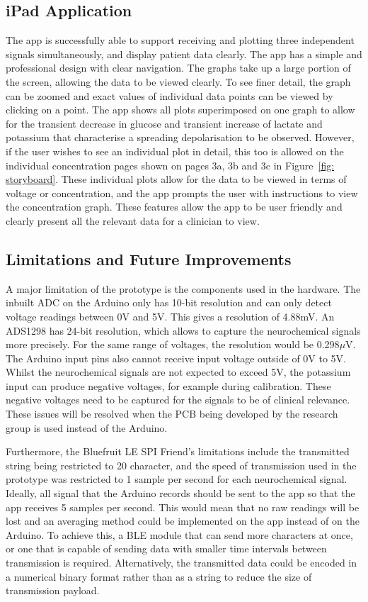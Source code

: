 \subsection{iPad Application}
The app is successfully able to support receiving and plotting three independent signals simultaneously, and display patient data clearly. The app has a simple and professional design with clear navigation. The graphs take up a large portion of the screen, allowing the data to be viewed clearly. To see finer detail, the graph can be zoomed and exact values of individual data points can be viewed by clicking on a point. The app shows all plots superimposed on one graph to allow for the transient decrease in glucose and transient increase of lactate and potassium that characterise a spreading depolarisation to be observed. However, if the user wishes to see an individual plot in detail, this too is allowed on the individual concentration pages shown on pages 3a, 3b and 3c in Figure~\ref{fig: storyboard}. These individual plots allow for the data to be viewed in terms of voltage or concentration, and the app prompts the user with instructions to view the concentration graph. These features allow the app to be user friendly and clearly present all the relevant data for a clinician to view.




\subsection{Limitations and Future Improvements}
A major limitation of the prototype is the components used in the hardware. The inbuilt ADC on the Arduino only has 10-bit resolution and can only detect voltage readings between 0V and 5V. This gives a resolution of 4.88mV. An ADS1298 has 24-bit resolution, which allows to capture the neurochemical signals more precisely. For the same range of voltages, the resolution would be 0.298$\mu$V. The Arduino input pins also cannot receive input voltage outside of 0V to 5V. Whilst the neurochemical signals are not expected to exceed 5V, the potassium input can produce negative voltages, for example during calibration. These negative voltages need to be captured for the signals to be of clinical relevance. These issues will be resolved when the PCB being developed by the research group is used instead of the Arduino.

Furthermore, the Bluefruit LE SPI Friend's limitations include the transmitted string being restricted to 20 character, and the speed of transmission used in the prototype was restricted to 1 sample per second for each neurochemical signal. Ideally, all signal that the Arduino records should be sent to the app so that the app receives 5 samples per second. This would mean that no raw readings will be lost and an averaging method could be implemented on the app instead of on the Arduino. To achieve this, a BLE module that can send more characters at once, or one that is capable of sending data with smaller time intervals between transmission is required. Alternatively, the transmitted data could be encoded in a numerical binary format rather than as a string to reduce the size of transmission payload. 

